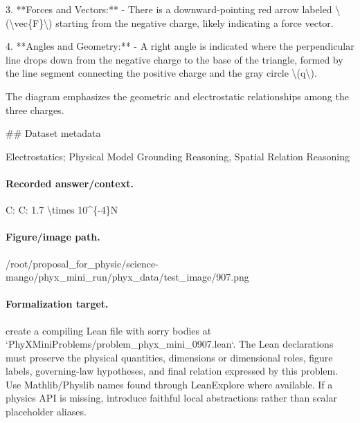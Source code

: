 3. **Forces and Vectors:**
   - There is a downward-pointing red arrow labeled \textbackslash{}(\textbackslash{}vec\{F\}\textbackslash{}) starting from the negative charge, likely indicating a force vector.

4. **Angles and Geometry:**
   - A right angle is indicated where the perpendicular line drops down from the negative charge to the base of the triangle, formed by the line segment connecting the positive charge and the gray circle \textbackslash{}(q\textbackslash{}).

The diagram emphasizes the geometric and electrostatic relationships among the three charges.

\#\# Dataset metadata

Electrostatics; Physical Model Grounding Reasoning, Spatial Relation Reasoning

\paragraph{Recorded answer/context.}
C: C: 1.7 \textbackslash{}times 10\textasciicircum{}\{-4\}N

\paragraph{Figure/image path.}
/root/proposal\_for\_physic/science-mango/phyx\_mini\_run/phyx\_data/test\_image/907.png

\paragraph{Formalization target.}
create a compiling Lean file with sorry bodies at `PhyXMiniProblems/problem\_phyx\_mini\_0907.lean`. The Lean declarations must preserve the physical quantities, dimensions or dimensional roles, figure labels, governing-law hypotheses, and final relation expressed by this problem.
Use Mathlib/Physlib names found through LeanExplore where available. If a physics API is missing, introduce faithful local abstractions rather than scalar placeholder aliases.

